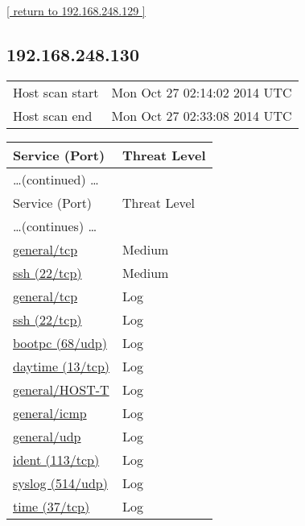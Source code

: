 \documentclass{article}
\begin{document}
\begin{footnotesize}\hyperref[host:192.168.248.129]{[ return to 192.168.248.129 ]}\end{footnotesize}
\subsection{192.168.248.130}
\label{host:192.168.248.130}

\begin{tabular}{ll}
Host scan start&Mon Oct 27 02:14:02 2014 UTC\\
Host scan end&Mon Oct 27 02:33:08 2014 UTC\\
\end{tabular}

\begin{longtable}{|l|l|}
\hline
\rowcolor{openvas_report}Service (Port)&Threat Level\\
\hline
\endfirsthead
\multicolumn{2}{l}{\hfill\ldots (continued) \ldots}\\
\hline
\rowcolor{openvas_report}Service (Port)&Threat Level\\
\hline
\endhead
\hline
\multicolumn{2}{l}{\ldots (continues) \ldots}\\
\endfoot
\hline
\endlastfoot
\hline
\hyperref[port:192.168.248.130 general/tcp Medium]{general/tcp}&Medium\\
\hline
\hyperref[port:192.168.248.130 ssh (22/tcp) Medium]{ssh (22/tcp)}&Medium\\
\hline
\hyperref[port:192.168.248.130 general/tcp Log]{general/tcp}&Log\\
\hline
\hyperref[port:192.168.248.130 ssh (22/tcp) Log]{ssh (22/tcp)}&Log\\
\hline
\hyperref[port:192.168.248.130 bootpc (68/udp) Log]{bootpc (68/udp)}&Log\\
\hline
\hyperref[port:192.168.248.130 daytime (13/tcp) Log]{daytime (13/tcp)}&Log\\
\hline
\hyperref[port:192.168.248.130 general/HOST-T Log]{general/HOST-T}&Log\\
\hline
\hyperref[port:192.168.248.130 general/icmp Log]{general/icmp}&Log\\
\hline
\hyperref[port:192.168.248.130 general/udp Log]{general/udp}&Log\\
\hline
\hyperref[port:192.168.248.130 ident (113/tcp) Log]{ident (113/tcp)}&Log\\
\hline
\hyperref[port:192.168.248.130 syslog (514/udp) Log]{syslog (514/udp)}&Log\\
\hline
\hyperref[port:192.168.248.130 time (37/tcp) Log]{time (37/tcp)}&Log\\
\hline
\end{longtable}
\end{document}
